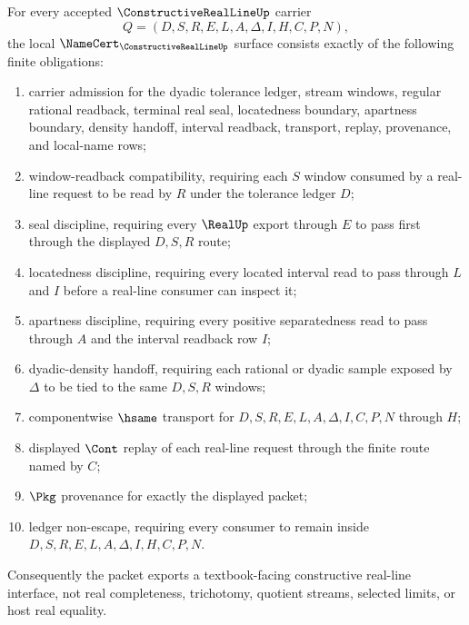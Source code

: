 \begin{theorem}
\label{thm:constructive-real-line-namecert-obligations}
For every accepted $\ConstructiveRealLineUp$ carrier
$$
Q=(D,S,R,E,L,A,\Delta,I,H,C,P,N),
$$
the local $\NameCert_{\ConstructiveRealLineUp}$ surface consists exactly of the following finite obligations:
\begin{enumerate}
\item carrier admission for the dyadic tolerance ledger, stream windows, regular rational readback, terminal real seal, locatedness boundary, apartness boundary, density handoff, interval readback, transport, replay, provenance, and local-name rows;
\item window-readback compatibility, requiring each $S$ window consumed by a real-line request to be read by $R$ under the tolerance ledger $D$;
\item seal discipline, requiring every $\RealUp$ export through $E$ to pass first through the displayed $D,S,R$ route;
\item locatedness discipline, requiring every located interval read to pass through $L$ and $I$ before a real-line consumer can inspect it;
\item apartness discipline, requiring every positive separatedness read to pass through $A$ and the interval readback row $I$;
\item dyadic-density handoff, requiring each rational or dyadic sample exposed by $\Delta$ to be tied to the same $D,S,R$ windows;
\item componentwise $\hsame$ transport for $D,S,R,E,L,A,\Delta,I,C,P,N$ through $H$;
\item displayed $\Cont$ replay of each real-line request through the finite route named by $C$;
\item $\Pkg$ provenance for exactly the displayed packet;
\item ledger non-escape, requiring every consumer to remain inside $D,S,R,E,L,A,\Delta,I,H,C,P,N$.
\end{enumerate}
Consequently the packet exports a textbook-facing constructive real-line interface, not real completeness, trichotomy, quotient streams, selected limits, or host real equality.
\end{theorem}
